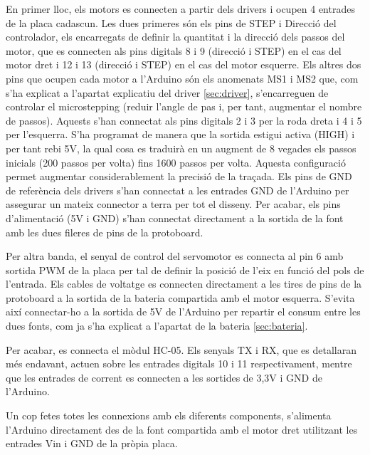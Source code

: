 En primer lloc, els motors es connecten a partir dels drivers i ocupen 4 entrades de la placa cadascun. Les dues primeres són els pins de STEP i Direcció del controlador, els encarregats de definir la quantitat i la direcció dels passos del motor, que es connecten als pins digitals 8 i 9 (direcció i STEP) en el cas del motor dret i 12 i 13 (direcció i STEP) en el cas del motor esquerre. Els altres dos pins que ocupen cada motor a l’Arduino són els anomenats MS1 i MS2 que, com s’ha explicat a l’apartat explicatiu del driver \ref{sec:driver}, s’encarreguen de controlar el microstepping (reduir l’angle de pas i, per tant, augmentar el nombre de passos). Aquests s’han connectat als pins digitals 2 i 3 per la roda dreta i 4 i 5 per l’esquerra. S’ha programat de manera que la sortida estigui activa (HIGH) i per tant rebi 5V, la qual cosa es traduirà en un augment de 8 vegades els passos inicials (200 passos per volta) fins 1600 passos per volta. Aquesta configuració permet augmentar considerablement la precisió de la traçada. Els pins de GND de referència dels drivers s’han connectat a les entrades GND de l’Arduino per assegurar un mateix connector a terra per tot el disseny. Per acabar, els pins d’alimentació (5V i GND) s’han connectat directament a la sortida de la font amb les dues fileres de pins de la protoboard. 

Per altra banda, el senyal de control del servomotor es connecta al pin 6 amb sortida PWM de la placa per tal de definir la posició de l’eix en funció del pols de l’entrada. Els cables de voltatge es connecten directament a les tires de pins de la protoboard a la sortida de la bateria compartida amb el motor esquerra.  S’evita així connectar-ho a la sortida de 5V de l’Arduino per repartir el consum entre les dues fonts, com ja s’ha explicat a l’apartat de la bateria \ref{sec:bateria}. 

Per acabar, es connecta el mòdul HC-05. Els senyals TX i RX, que es detallaran més endavant, actuen sobre les entrades digitals 10 i 11 respectivament, mentre que les entrades de corrent es connecten a les sortides de 3,3V i GND de l’Arduino. 

Un cop fetes totes les connexions amb els diferents components, s’alimenta l’Arduino directament des de la font compartida amb el motor dret utilitzant les entrades Vin i GND de la pròpia placa. 


